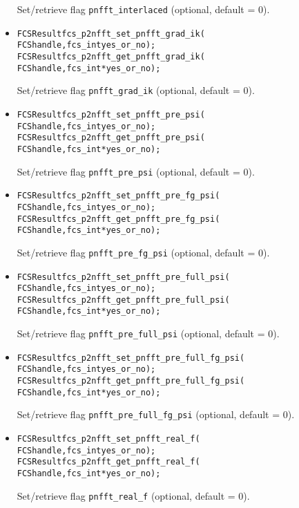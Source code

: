 \begin{itemize}
    Set/retrieve flag \verb!pnfft_interlaced! (optional, default = 0).
  \item
\begin{alltt}
FCSResult fcs_p2nfft_set_pnfft_grad_ik(
    FCS handle, fcs_int yes_or_no);
FCSResult fcs_p2nfft_get_pnfft_grad_ik(
    FCS handle, fcs_int* yes_or_no);
\end{alltt}
    Set/retrieve flag \verb!pnfft_grad_ik! (optional, default = 0).
  \item
\begin{alltt}
FCSResult fcs_p2nfft_set_pnfft_pre_psi(
    FCS handle, fcs_int yes_or_no);
FCSResult fcs_p2nfft_get_pnfft_pre_psi(
    FCS handle, fcs_int* yes_or_no);
\end{alltt}
    Set/retrieve flag \verb!pnfft_pre_psi! (optional, default = 0).
  \item
\begin{alltt}
FCSResult fcs_p2nfft_set_pnfft_pre_fg_psi(
    FCS handle, fcs_int yes_or_no);
FCSResult fcs_p2nfft_get_pnfft_pre_fg_psi(
    FCS handle, fcs_int* yes_or_no);
\end{alltt}
    Set/retrieve flag \verb!pnfft_pre_fg_psi! (optional, default = 0).
  \item
\begin{alltt}
FCSResult fcs_p2nfft_set_pnfft_pre_full_psi(
    FCS handle, fcs_int yes_or_no);
FCSResult fcs_p2nfft_get_pnfft_pre_full_psi(
    FCS handle, fcs_int* yes_or_no);
\end{alltt}
    Set/retrieve flag \verb!pnfft_pre_full_psi! (optional, default = 0).
  \item
\begin{alltt}
FCSResult fcs_p2nfft_set_pnfft_pre_full_fg_psi(
    FCS handle, fcs_int yes_or_no);
FCSResult fcs_p2nfft_get_pnfft_pre_full_fg_psi(
    FCS handle, fcs_int* yes_or_no);
\end{alltt}
    Set/retrieve flag \verb!pnfft_pre_full_fg_psi! (optional, default = 0).
  \item
\begin{alltt}
FCSResult fcs_p2nfft_set_pnfft_real_f(
    FCS handle, fcs_int yes_or_no);
FCSResult fcs_p2nfft_get_pnfft_real_f(
    FCS handle, fcs_int* yes_or_no);
\end{alltt}
    Set/retrieve flag \verb!pnfft_real_f! (optional, default = 0).
\end{itemize}

